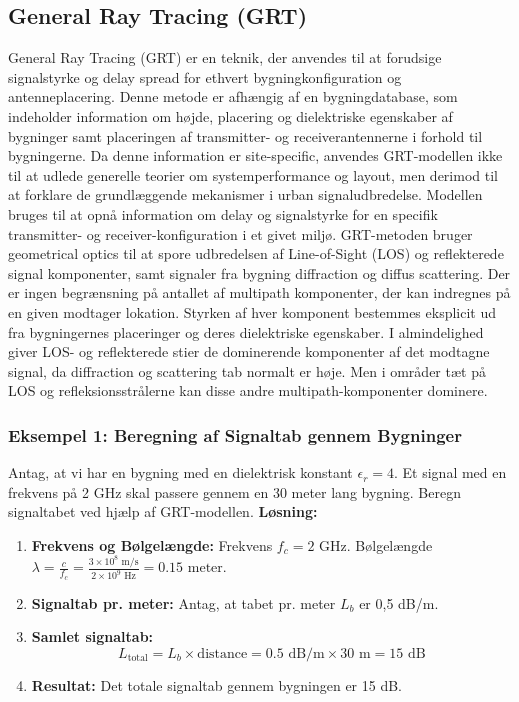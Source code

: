\documentclass[a4paper,12pt]{book}
\begin{document}
	\subsection{General Ray Tracing (GRT)}
	General Ray Tracing (GRT) er en teknik, der anvendes til at forudsige signalstyrke og delay spread for ethvert bygningkonfiguration og antenneplacering. Denne metode er afhængig af en bygningdatabase, som indeholder information om højde, placering og dielektriske egenskaber af bygninger samt placeringen af transmitter- og receiverantennerne i forhold til bygningerne. Da denne information er site-specific, anvendes GRT-modellen ikke til at udlede generelle teorier om systemperformance og layout, men derimod til at forklare de grundlæggende mekanismer i urban signaludbredelse. Modellen bruges til at opnå information om delay og signalstyrke for en specifik transmitter- og receiver-konfiguration i et givet miljø.
	\newline\newline\noindent GRT-metoden bruger geometrical optics til at spore udbredelsen af Line-of-Sight (LOS) og reflekterede signal komponenter, samt signaler fra bygning diffraction og diffus scattering. Der er ingen begrænsning på antallet af multipath komponenter, der kan indregnes på en given modtager lokation. Styrken af hver komponent bestemmes eksplicit ud fra bygningernes placeringer og deres dielektriske egenskaber. I almindelighed giver LOS- og reflekterede stier de dominerende komponenter af det modtagne signal, da diffraction og scattering tab normalt er høje. Men i områder tæt på LOS og refleksionsstrålerne kan disse andre multipath-komponenter dominere.
	\subsubsection{Eksempel 1: Beregning af Signaltab gennem Bygninger}
	\noindent Antag, at vi har en bygning med en dielektrisk konstant \( \epsilon_r = 4 \). Et signal med en frekvens på 2 GHz skal passere gennem en 30 meter lang bygning. Beregn signaltabet ved hjælp af GRT-modellen.
	\newline\newline
	\noindent \textbf{Løsning:}
	\begin{enumerate}
		\item \textbf{Frekvens og Bølgelængde:} Frekvens \( f_c = 2 \) GHz. Bølgelængde \( \lambda = \frac{c}{f_c} = \frac{3 \times 10^8 \text{ m/s}}{2 \times 10^9 \text{ Hz}} = 0.15 \text{ meter} \).
		\item \textbf{Signaltab pr. meter:} Antag, at tabet pr. meter \( L_b \) er 0,5 dB/m. 
		\item \textbf{Samlet signaltab:} 
		\[
		L_{\text{total}} = L_b \times \text{distance} = 0.5 \text{ dB/m} \times 30 \text{ m} = 15 \text{ dB}
		\]
		\item \textbf{Resultat:} Det totale signaltab gennem bygningen er 15 dB.
	\end{enumerate}
	
\end{document}
